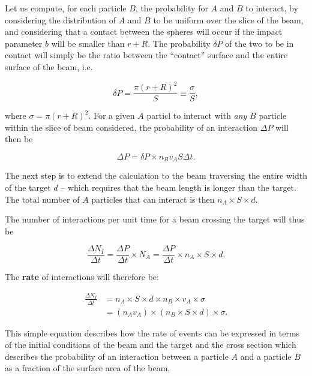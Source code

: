 Let us compute, for each particle $B$, the probability for $A$ and $B$ to interact, by considering the distribution of $A$ and $B$ to be uniform over the slice of the beam, and considering that a contact between the spheres will occur if the impact parameter $b$ will be smaller than $r+R$. The probability $\delta P$ of the two to be in contact will simply be the ratio between the ``contact'' surface and the entire surface of the beam, i.e.

\[ \delta P = \frac{\pi (r+R)^2}{S} \equiv \frac{\sigma}{S}, \]

\noindent where $\sigma = \pi (r+R)^2$. For a given $A$ particl to interact with \emph{any}  $B$ particle within the slice of beam considered, the probability of an interaction $\Delta P$ will then be

\[ \Delta P = \delta P \times n_B v_A S \Delta t.\]

The next step is to extend the calculation to the beam traversing the entire width of the target $d$ -- which requires that the beam length is longer than the target. The total number of $A$ particles that can interact is then $n_A \times S \times d$.

The number of interactions per unit time for a beam crossing the target will thus be

\[\frac{\Delta N_I}{\Delta t} =\frac{\Delta P}{\Delta t} \times N_A= \frac{\Delta P}{\Delta t} \times n_A \times S \times d. \]

The {\bf rate} of interactions will therefore be:

\begin{align*}
\frac{\Delta N_I}{\Delta t} & =  n_A \times S \times d \times n_B \times v_A \times \sigma \\
& =  (n_A v_A) \times (n_B \times S \times d) \times \sigma.
\end{align*}

This simple equation describes how the rate of events can be expressed in terms of the initial conditions of the beam and the target and the cross section which describes the probability of an interaction between a particle $A$ and a particle $B$ as a fraction of the surface area of the beam.



